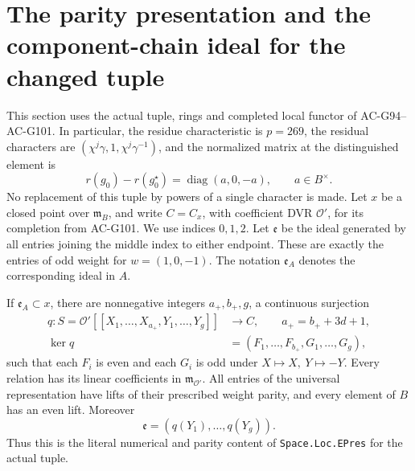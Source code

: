 \section{The parity presentation and the component-chain ideal for the changed tuple}

This section uses the actual tuple, rings and completed local functor of
AC-G94--AC-G101.  In particular, the residue characteristic is
\(p=269\), the residual characters are
\((\chi^j\gamma,1,\chi^j\gamma^{-1})\), and the normalized
matrix at the distinguished element is
\[
 r(g_0)-r(g_0^\star)=\operatorname{diag}(a,0,-a),
 \qquad a\in B^\times .
 \tag{G105.1}
\]
No replacement of this tuple by powers of a single character is made.
Let \(x\) be a closed point over \(\mathfrak m_B\), and write
\(C=C_x\), with coefficient DVR \(\mathcal O'\), for its
completion from AC-G101.  We use indices \(0,1,2\).  Let
\(\mathfrak e\) be the ideal generated by all entries joining
the middle index to either endpoint.  These are exactly the
entries of odd weight for \(w=(1,0,-1)\).  The notation
\(\mathfrak e_A\) denotes the corresponding ideal in \(A\).

\begin{theorem}
\label{AC-G105-parity}
If \(\mathfrak e_A\subset x\), there are nonnegative integers
\(a_+,b_+,g\), a continuous surjection
\[
 \begin{split}
 q:S=\mathcal O'[[X_1,\ldots,X_{a_+},Y_1,\ldots,Y_g]]&\longrightarrow C,\qquad
 a_+=b_++3d+1,\\
 \ker q&=(F_1,\ldots,F_{b_+},G_1,\ldots,G_g),
 \end{split}
 \tag{G105.2}
\]
such that each \(F_i\) is even and each \(G_i\) is odd under
\(X\mapsto X,\ Y\mapsto-Y\).  Every relation has its linear
coefficients in \(\mathfrak m_{\mathcal O'}\).  All entries of
the universal representation have lifts of their prescribed
weight parity, and every element of \(B\) has an even lift.
Moreover
\[
                         \mathfrak e=(q(Y_1),\ldots,q(Y_g)).
 \tag{G105.3}
\]
Thus this is the literal numerical and parity content of
\texttt{Space.Loc.EPres} for the actual tuple.
\end{theorem}

